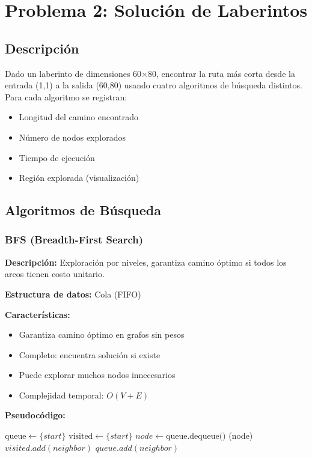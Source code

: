 \documentclass[12pt,a4paper]{article}
\begin{document}
\section{Problema 2: Solución de Laberintos}

\subsection{Descripción}

Dado un laberinto de dimensiones 60×80, encontrar la ruta más corta desde la entrada (1,1) a la salida (60,80) usando cuatro algoritmos de búsqueda distintos. Para cada algoritmo se registran:
\begin{itemize}
    \item Longitud del camino encontrado
    \item Número de nodos explorados
    \item Tiempo de ejecución
    \item Región explorada (visualización)
\end{itemize}

\subsection{Algoritmos de Búsqueda}

\subsubsection{BFS (Breadth-First Search)}

\textbf{Descripción:} Exploración por niveles, garantiza camino óptimo si todos los arcos tienen costo unitario.

\textbf{Estructura de datos:} Cola (FIFO)

\textbf{Características:}
\begin{itemize}
    \item Garantiza camino óptimo en grafos sin pesos
    \item Completo: encuentra solución si existe
    \item Puede explorar muchos nodos innecesarios
    \item Complejidad temporal: $O(V + E)$
\end{itemize}

\textbf{Pseudocódigo:}
\begin{algorithm}[H]
\caption{BFS}
\begin{algorithmic}
\State $\text{queue} \gets \{start\}$
\State $\text{visited} \gets \{start\}$
    \State $node \gets \text{queue.dequeue()}$
        \Return {}(node)
    \EndIf
            \State $visited.add(neighbor)$
            \State $queue.add(neighbor)$
        \EndIf
    \EndFor
\EndWhile
\end{algorithmic}
\end{algorithm}
\end{document}
